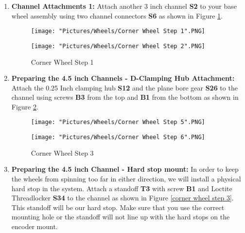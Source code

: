 \documentclass[12pt]{article}
\begin{document}
\begin{enumerate}
\item \textbf{Channel Attachments 1:} Attach another 3 inch channel \textbf{S2} to your base wheel assembly using two channel connectors \textbf{S6} as shown in Figure \ref{corner wheel step 1}.

\begin{figure}[H]
  \centering
  \begin{minipage}[b]{0.45\textwidth}
    \texttt{[image: "Pictures/Wheels/Corner Wheel Step 1".PNG]}
  \end{minipage}
  \hfill
  \begin{minipage}[b]{0.45\textwidth}
    \texttt{[image: "Pictures/Wheels/Corner Wheel Step 2".PNG]}
  \end{minipage}
  \caption{Corner Wheel Step 1}
  \label{corner wheel step 1}
\end{figure}

\item \textbf{Preparing the 4.5 inch Channels - D-Clamping Hub Attachment:} Attach the 0.25 Inch clamping hub \textbf{S12} and the plane bore gear \textbf{S26} to the channel using screws \textbf{B3} from the top and \textbf{B1} from the bottom as shown in Figure \ref{corner wheel hub attachment}.

\begin{figure}[H]
  \centering
  \begin{minipage}[b]{0.45\textwidth}
    \texttt{[image: "Pictures/Wheels/Corner Wheel Step 5".PNG]}
  \end{minipage}
  \hfill
  \begin{minipage}[b]{0.45\textwidth}
    \texttt{[image: "Pictures/Wheels/Corner Wheel Step 6".PNG]}
  \end{minipage}
  \caption{Corner Wheel Step 3}
  \label{corner wheel hub attachment}
\end{figure}

\item \textbf{Preparing the 4.5 inch Channel - Hard stop mount:} In order to keep the wheels from spinning too far in either direction, we will install a physical hard stop in the system. Attach a standoff \textbf{T3} with screw \textbf{B1} and Loctite Threadlocker \textbf{S34} to the channel as shown in Figure \ref{corner wheel step 3}. This standoff will be our hard stop. Make sure that you use the correct mounting hole or the standoff will not line up with the hard stops on the encoder mount.


\end{enumerate}
\end{document}
